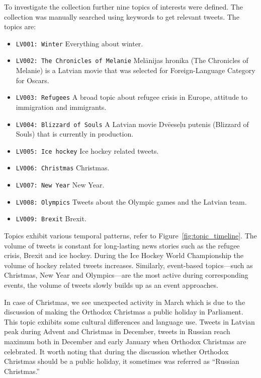 \documentclass{IOS-Book-Article}
\begin{document}
To investigate the collection further nine topics of interests were defined. The collection was manually searched using keywords to get relevant tweets. The topics are:
\begin{itemize}
\item \texttt{LV001: Winter} Everything about winter.
\item \texttt{LV002: 
The Chronicles of Melanie} Mel\=anijas hronika (The Chronicles of Melanie) is a Latvian movie that was selected for Foreign-Language Category for Oscars.
\item \texttt{LV003: Refugees} A broad topic about refugee crisis in Europe, attitude to immigration and immigrants.
\item \texttt{LV004: Blizzard of Souls} A Latvian movie Dv\=eese\c{l}u putenis (Blizzard of Souls) that is currently in production.
\item \texttt{LV005: Ice hockey} Ice hockey related tweets.
\item \texttt{LV006: Christmas} Christmas.
\item \texttt{LV007: New Year} New Year.
\item \texttt{LV008: Olympics} Tweets about the Olympic games and the Latvian team.
\item \texttt{LV009: Brexit} Brexit.
\end{itemize}

Topics exhibit various temporal patterns, refer to Figure~\ref{fig:topic_timeline}. The volume of tweets is constant for long-lasting news stories such as the refugee crisis, Brexit and ice hockey.
%
During the Ice Hockey World Championship the volume of hockey related tweets increases. Similarly, event-based topics---such as Christmas, New Year and Olympics---are the most active during corresponding events, the volume of tweets slowly builds up as an event approaches.

In case of Christmas, we see unexpected activity in March which is due to the discussion of making the Orthodox Christmas a public holiday in Parliament. This topic exhibits some cultural differences and language use. Tweets in Latvian peak during Advent and Christmas in December, tweets in Russian reach maximum both in December and early January when Orthodox Christmas are celebrated. It worth noting that during the discussion whether Orthodox Christmas should be a public holiday, it sometimes was referred as ``Russian Christmas.''
\end{document}
